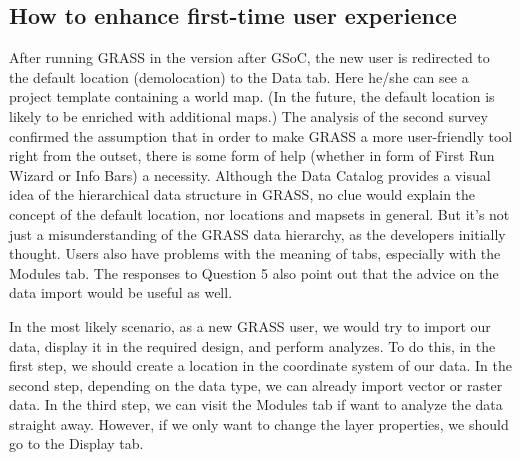 \documentclass[a4paper,10pt,twoside]{article}
\begin{document}
\subsection{How to enhance first-time user experience}
\label{sec:proposal1}

After running GRASS in the version after GSoC, the new user is
redirected to the default location (demolocation) to the Data
tab. Here he/she can see a project template containing a world
map. (In the future, the default location is likely to be enriched
with additional maps.) The analysis of the second survey confirmed the
assumption that in order to make GRASS a more user-friendly tool right
from the outset, there is some form of help (whether in form of First
Run Wizard or Info Bars) a necessity. Although the Data Catalog
provides a visual idea of the hierarchical data structure in GRASS, no
clue would explain the concept of the default location, nor locations
and mapsets in general. But it's not just a misunderstanding of the
GRASS data hierarchy, as the developers initially thought. Users also
have problems with the meaning of tabs, especially with the Modules
tab. The responses to Question 5 also point out that the advice on the
data import would be useful as well.

In the most likely scenario, as a new GRASS user, we would try to
import our data, display it in the required design, and perform
analyzes. To do this, in the first step, we should create a location
in the coordinate system of our data. In the second step, depending on
the data type, we can already import vector or raster data. In the
third step, we can visit the Modules tab if want to analyze the data
straight away. However, if we only want to change the layer
properties, we should go to the Display tab.
\end{document}
